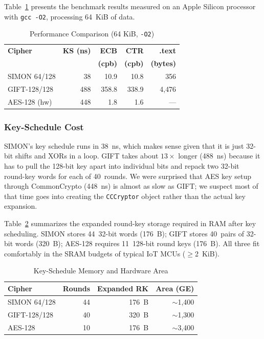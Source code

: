 \documentclass[conference]{IEEEtran}
\begin{document}
Table~\ref{tab:bench} presents the benchmark results measured on an Apple
Silicon processor with \texttt{gcc -O2}, processing 64~KiB of data.

\begin{table}[htbp]
\caption{Performance Comparison (64 KiB, \texttt{-O2})}
\label{tab:bench}
\centering
\begin{tabular}{lrrrr}
\toprule
\textbf{Cipher} & \textbf{KS (ns)} & \textbf{ECB} & \textbf{CTR} & \textbf{.text} \\
 & & \textbf{(cpb)} & \textbf{(cpb)} & \textbf{(bytes)} \\
\midrule
SIMON 64/128  &  38 & 10.9 & 10.8 &   356 \\
GIFT-128/128  & 488 & 358.8 & 338.9 & 4{,}476 \\
AES-128 (hw)  & 448 &  1.8 &  1.6 & --- \\
\bottomrule
\end{tabular}
\end{table}

\subsubsection{Key-Schedule Cost}

SIMON's key schedule runs in 38~ns, which makes sense given that it
is just 32-bit shifts and XORs in a loop.  GIFT takes about $13\times$
longer (488~ns) because it has to pull the 128-bit key apart into
individual bits and repack two 32-bit round-key words for each of
40~rounds.  We were surprised that AES key setup through CommonCrypto
(448~ns) is almost as slow as GIFT; we suspect most of that time goes
into creating the \texttt{CCCryptor} object rather than the actual
key expansion.

Table~\ref{tab:ksmem} summarizes the expanded round-key storage required
in RAM after key scheduling.  SIMON stores 44~32-bit words (176~B);
GIFT stores 40~pairs of 32-bit words (320~B); AES-128 requires 11~128-bit
round keys (176~B).  All three fit comfortably in the SRAM budgets of
typical IoT MCUs ($\geq$2~KiB).

\begin{table}[htbp]
\caption{Key-Schedule Memory and Hardware Area}
\label{tab:ksmem}
\centering\small
\begin{tabular}{lrrr}
\toprule
\textbf{Cipher} & \textbf{Rounds} & \textbf{Expanded RK} & \textbf{Area (GE)} \\
\midrule
SIMON 64/128  & 44 & 176~B & $\sim$1{,}400 \\
GIFT-128/128  & 40 & 320~B & $\sim$1{,}300 \\
AES-128       & 10 & 176~B & $\sim$3{,}400 \\
\bottomrule
\end{tabular}
\end{table}
\end{document}
